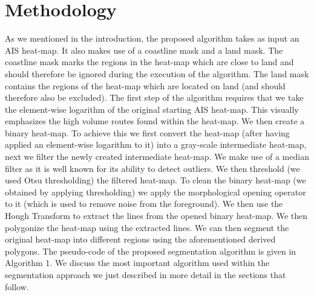 \documentclass{article}
\begin{document}
\section{Methodology}
\label{sec:met}
As we mentioned in the introduction, the proposed algorithm takes as input an AIS heat-map. It also makes use of a coastline mask and a land mask. The coastline mask
marks the regions in the heat-map which are close to land and should therefore be ignored during the execution of the algorithm. The land mask contains the regions of the heat-map which 
are located on land (and should therefore also be excluded). The first step of the algorithm requires that we take the element-wise logarithm of the original starting AIS heat-map. This visually emphasizes the high volume routes found within the heat-map. We then 
create a binary heat-map. To achieve this we first convert the heat-map (after having applied an element-wise logarithm to it) into a gray-scale intermediate heat-map, next we filter the newly created intermediate heat-map. We make use of a median filter as it is well known for its ability to detect outliers. We then threshold (we used Otsu thresholding) the  
filtered heat-map. To clean the binary heat-map (we obtained by applying thresholding) we apply the morphological opening operator to it (which is used to remove noise from the foreground).
We then use the Hough Transform to extract the lines from the opened binary heat-map. We then polygonize the heat-map using the extracted lines. We can then 
segment the original heat-map into different regions using the aforementioned derived polygons. The pseudo-code of the proposed segmentation algorithm is given in Algorithm 1. We discuss the most important algorithm used within the segmentation approach we 
just described in more detail in the sections that follow.  
\end{document}
